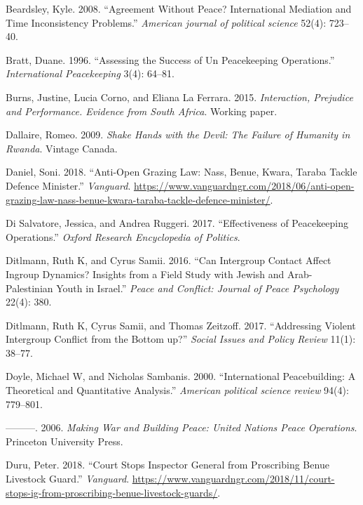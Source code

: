 \documentclass[11pt]{article}
\begin{document}
\hypertarget{ref-beardsley2008agreement}{}
Beardsley, Kyle. 2008. ``Agreement Without Peace? International
Mediation and Time Inconsistency Problems.'' \emph{American journal of
political science} 52(4): 723--40.

\hypertarget{ref-bratt1996assessing}{}
Bratt, Duane. 1996. ``Assessing the Success of Un Peacekeeping
Operations.'' \emph{International Peacekeeping} 3(4): 64--81.

\hypertarget{ref-burns2015interaction}{}
Burns, Justine, Lucia Corno, and Eliana La Ferrara. 2015.
\emph{Interaction, Prejudice and Performance. Evidence from South
Africa}. Working paper.

\hypertarget{ref-dallaire2009shake}{}
Dallaire, Romeo. 2009. \emph{Shake Hands with the Devil: The Failure of
Humanity in Rwanda}. Vintage Canada.

\hypertarget{ref-daniel2018anti}{}
Daniel, Soni. 2018. ``Anti-Open Grazing Law: Nass, Benue, Kwara, Taraba
Tackle Defence Minister.'' \emph{Vanguard}.
\url{https://www.vanguardngr.com/2018/06/anti-open-grazing-law-nass-benue-kwara-taraba-tackle-defence-minister/}.

\hypertarget{ref-di2017effectiveness}{}
Di Salvatore, Jessica, and Andrea Ruggeri. 2017. ``Effectiveness of
Peacekeeping Operations.'' \emph{Oxford Research Encyclopedia of
Politics}.

\hypertarget{ref-ditlmann2016can}{}
Ditlmann, Ruth K, and Cyrus Samii. 2016. ``Can Intergroup Contact Affect
Ingroup Dynamics? Insights from a Field Study with Jewish and
Arab-Palestinian Youth in Israel.'' \emph{Peace and Conflict: Journal of
Peace Psychology} 22(4): 380.

\hypertarget{ref-ditlmann2017addressing}{}
Ditlmann, Ruth K, Cyrus Samii, and Thomas Zeitzoff. 2017. ``Addressing
Violent Intergroup Conflict from the Bottom up?'' \emph{Social Issues
and Policy Review} 11(1): 38--77.

\hypertarget{ref-doyle2000international}{}
Doyle, Michael W, and Nicholas Sambanis. 2000. ``International
Peacebuilding: A Theoretical and Quantitative Analysis.'' \emph{American
political science review} 94(4): 779--801.

\hypertarget{ref-doyle2006making}{}
---------. 2006. \emph{Making War and Building Peace: United Nations
Peace Operations}. Princeton University Press.

\hypertarget{ref-duru2018court}{}
Duru, Peter. 2018. ``Court Stops Inspector General from Proscribing
Benue Livestock Guard.'' \emph{Vanguard}.
\url{https://www.vanguardngr.com/2018/11/court-stops-ig-from-proscribing-benue-livestock-guards/}.
\end{document}
